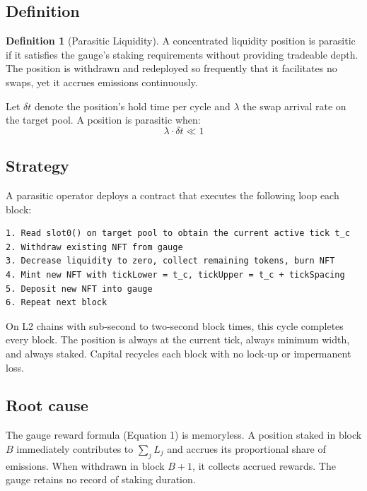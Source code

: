 \documentclass[11pt,a4paper]{article}
\theoremstyle{definition}
\newtheorem{definition}{Definition}
\begin{document}
\subsection{Definition}\label{sec:def}

\begin{definition}[Parasitic Liquidity]
A concentrated liquidity position is parasitic if it satisfies the gauge's staking requirements without providing tradeable depth. The position is withdrawn and redeployed so frequently that it facilitates no swaps, yet it accrues emissions continuously.
\end{definition}

Let $\delta t$ denote the position's hold time per cycle and $\lambda$ the swap arrival rate on the target pool. A position is parasitic when:
\begin{equation}
\lambda \cdot \delta t \ll 1
\end{equation}

\subsection{Strategy}\label{sec:strategy}

A parasitic operator deploys a contract that executes the following loop each block:


\begin{center}\begin{minipage}{0.85\textwidth}\begin{verbatim}
1. Read slot0() on target pool to obtain the current active tick t_c
2. Withdraw existing NFT from gauge
3. Decrease liquidity to zero, collect remaining tokens, burn NFT
4. Mint new NFT with tickLower = t_c, tickUpper = t_c + tickSpacing
5. Deposit new NFT into gauge
6. Repeat next block
\end{verbatim}\end{minipage}\end{center}


On L2 chains with sub-second to two-second block times, this cycle completes every block. The position is always at the current tick, always minimum width, and always staked. Capital recycles each block with no lock-up or impermanent loss.

\subsection{Root cause}\label{sec:rootcause}

The gauge reward formula (Equation 1) is memoryless. A position staked in block $B$ immediately contributes to $\sum_j L_j$ and accrues its proportional share of emissions. When withdrawn in block $B+1$, it collects accrued rewards. The gauge retains no record of staking duration.
\end{document}
